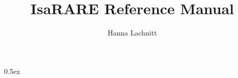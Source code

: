 \documentclass[11pt,a4paper]{article}
\begin{document}
\title{IsaRARE Reference Manual}
\author{Hanna Lachnitt}
\maketitle

\tableofcontents

\parindent 0pt\parskip 0.5ex



%
%
\end{document}

